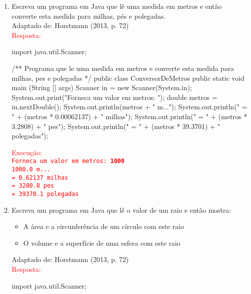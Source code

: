 \documentclass[onecolumn,a4paper,10pt]{report}
\newcommand{\+}{\, + \,}
\newcommand{\<}{\hspace*{-0.4cm}}
\begin{document}
\begin{enumerate}[1.]
\item Escreva um programa em Java que lê uma medida em metros e então converte esta medida para milhas, pés e polegadas.\\
{\tiny Adaptado de: Horstmann (2013, p. 72)}\\
\textcolor{red}{Resposta:}\\
\begin{javacode}
import java.util.Scanner;

/**
   Programa que le uma medida em metros e converte
   esta medida para milhas, pes e polegadas
 */
public class ConversorDeMetros {
    public static void main (String [] args) {
        Scanner in = new Scanner(System.in);
        System.out.print("Forneca um valor em metros: ");
        double metros = in.nextDouble();
        System.out.println(metros + " m...");
        System.out.println(" = " + (metros * 0.00062137) + " milhas");
        System.out.println(" = " + (metros * 3.2808) + " pes");
        System.out.println(" = " + (metros * 39.3701) + " polegadas");
    }
}
\end{javacode}
\textcolor{red}{Execução:\\
\texttt{Forneca um valor em metros: \textbf{1000}\\
1000.0 m...\\
 = 0.62137 milhas\\
 = 3280.8 pes\\
 = 39370.1 polegadas}
}

\item Escreva um programa em Java que lê o valor de um raio e então mostra:
\begin{itemize}
	\item A área e a circunferência de um círculo com este raio
	\item O volume e a superfície de uma esfera com este raio
\end{itemize}
{\tiny Adaptado de: Horstmann (2013, p. 72)}\\
\textcolor{red}{Resposta:}\\
\begin{javacode}
import java.util.Scanner;


\end{javacode}
\end{enumerate}
\end{document}
